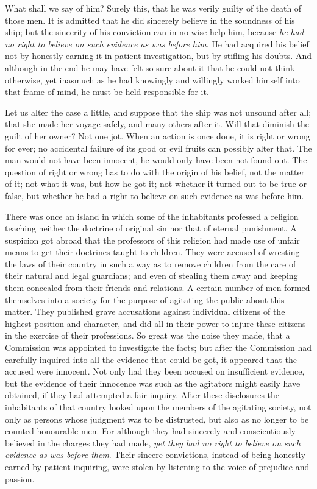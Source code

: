 \documentclass[12pt]{article}
\begin{document}
What shall we say of him? Surely this, that he was verily guilty of the death of those men. It is admitted that he did sincerely believe in the soundness of his ship; but the sincerity of his conviction can in no wise help him, because \emph{he had no right to believe on such evidence as was before him}. He had acquired his belief not by honestly earning it in patient investigation, but by stifling his doubts. And although in the end he may have felt so sure about it that he could not think otherwise, yet inasmuch as he had knowingly and willingly worked himself into that frame of mind, he must be held responsible for it.

Let us alter the case a little, and suppose that the ship was not unsound after all; that she made her voyage safely, and many others after it. Will that diminish the guilt of her owner? Not one jot. When an action is once done, it is right or wrong for ever; no accidental failure of its good or evil fruits can possibly alter that. The man would not have been innocent, he would only have been not found out. The question of right or wrong has to do with the origin of his belief, not the matter of it; not what it was, but how he got it; not whether it turned out to be true or false, but whether he had a right to believe on such evidence as was before him.

There was once an island in which some of the inhabitants professed a religion teaching neither the doctrine of original sin nor that of eternal punishment. A suspicion got abroad that the professors of this religion had made use of unfair means to get their doctrines taught to children. They were accused of wresting the laws of their country in such a way as to remove children from the care of their natural and legal guardians; and even of stealing them away and keeping them concealed from their friends and relations. A certain number of men formed themselves into a society for the purpose of agitating the public about this matter. They published grave accusations against individual citizens of the highest position and character, and did all in their power to injure these citizens in the exercise of their professions. So great was the noise they made, that a Commission was appointed to investigate the facts; but after the Commission had carefully inquired into all the evidence that could be got, it appeared that the accused were innocent. Not only had they been accused on insufficient evidence, but the evidence of their innocence was such as the agitators might easily have obtained, if they had attempted a fair inquiry. After these disclosures the inhabitants of that country looked upon the members of the agitating society, not only as persons whose judgment was to be distrusted, but also as no longer to be counted honourable men. For although they had sincerely and conscientiously believed in the charges they had made, \emph{yet they had no right to believe on such evidence as was before them}. Their sincere convictions, instead of being honestly earned by patient inquiring, were stolen by listening to the voice of prejudice and passion.
\end{document}
